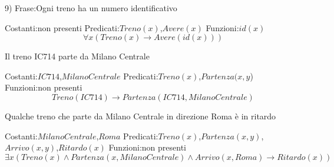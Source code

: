 9)
Frase:Ogni treno ha un numero identificativo

Costanti:non presenti \newline
Predicati:$Treno(x)$,$Avere(x)$\newline
Funzioni:$id(x)$
\begin{equation*}
    \forall x (Treno(x) \rightarrow Avere(id(x)))
\end{equation*}

Il treno IC714 parte da Milano Centrale

Costanti:$IC714$,$Milano Centrale$ \newline
Predicati:$Treno(x)$,$Partenza(x,y$)\newline
Funzioni:non presenti
\begin{equation*}
Treno(IC714) \rightarrow Partenza(IC714,Milano Centrale)
\end{equation*}

Qualche treno che parte da Milano Centrale in direzione Roma è in ritardo

Costanti:$Milano Centrale$,$Roma$ \newline
Predicati:$Treno(x)$,$Partenza(x,y)$,$Arrivo(x,y)$,$Ritardo(x)$ \newline
Funzioni:non presenti
\begin{equation*}
\exists x (Treno(x) \land Partenza(x,Milano Centrale) \land Arrivo(x,Roma) \rightarrow Ritardo(x))    
\end{equation*}
